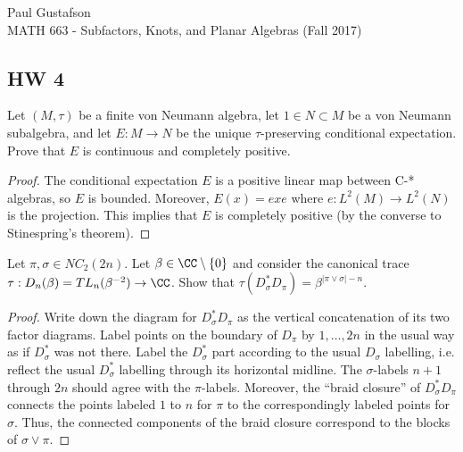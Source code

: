 \documentclass{article}
\begin{document}
\noindent Paul Gustafson\\
\noindent MATH 663 - Subfactors, Knots, and Planar Algebras (Fall 2017)

\subsection*{HW 4}
 Let $(M, \tau)$ be a finite von Neumann algebra, let $1 \in N \subset M$ be a von Neumann subalgebra, and let $E: M \to N$ be the unique $\tau$-preserving conditional expectation.  Prove that $E$ is continuous and completely positive.

\begin{proof}
  The conditional expectation $E$ is a positive linear map between C-* algebras, so $E$ is bounded. Moreover, $E(x) = exe$ where $e:L^2(M) \to L^2(N)$ is the projection.  This implies that $E$ is completely positive (by the converse to Stinespring's theorem).
\end{proof}

 Let $\pi, \sigma \in NC_2(2n)$.  Let $\beta \in \CC \setminus \{0\}$ and consider the canonical trace $\tau : D_n(\beta) = TL_n(\beta^{-2}) \to \CC$.  Show that $\tau(D_\sigma^* D_\pi) = \beta^{|\pi \vee \sigma| - n}$.
\begin{proof}
  Write down the diagram for $D_\sigma^* D_\pi$ as the vertical concatenation of its two factor diagrams.  Label points on the boundary of $D_\pi$ by $1, \ldots, 2n$ in the usual way as if $D_\sigma^*$ was not there.  Label the $D_\sigma^*$ part according to the usual $D_\sigma$ labelling, i.e. reflect the usual $D_\sigma^*$ labelling through its horizontal midline. The $\sigma$-labels $n+1$ through $2n$ should agree with the $\pi$-labels. Moreover, the ``braid closure'' of $D_\sigma^* D_\pi$ connects the points labeled $1$ to $n$ for $\pi$ to the correspondingly labeled points for $\sigma$.  Thus, the connected components of the braid closure correspond to the blocks of $\sigma \vee \pi$. 
\end{proof}
\end{document}
